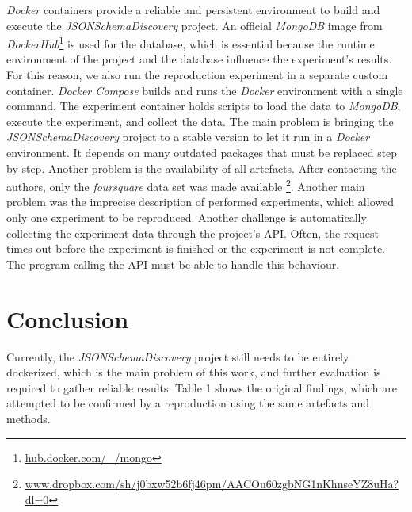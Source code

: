 \documentclass[sigconf, nonacm]{acmart}
\begin{document}
\textit{Docker} containers provide a reliable and persistent environment to build and execute the \textit{JSONSchemaDiscovery} project. An official \textit{MongoDB} image from \textit{DockerHub}\footnote{\url{hub.docker.com/_/mongo}} is used for the database, which is essential because the runtime environment of the project and the database influence the experiment's results. For this reason, we also run the reproduction experiment in a separate custom container. \textit{Docker Compose} builds and runs the \textit{Docker} environment with a single command. The experiment container holds scripts to load the data to \textit{MongoDB}, execute the experiment, and collect the data. The main problem is bringing the \textit{JSONSchemaDiscovery} project to a stable version to let it run in a \textit{Docker} environment. It depends on many outdated packages that must be replaced step by step. Another problem is the availability of all artefacts. After contacting the authors, only the \textit{foursquare} data set \cite{ccelikten2016modeling} was made available \footnote{\url{www.dropbox.com/sh/j0bxw52b6fj46pm/AACOu60zgbNG1nKhnseYZ8uHa?dl=0}}. Another main problem was the imprecise description of performed experiments, which allowed only one experiment to be reproduced. Another challenge is automatically collecting the experiment data through the project's API. Often, the request times out before the experiment is finished or the experiment is not complete. The program calling the API must be able to handle this behaviour.



\section{Conclusion}

Currently, the \textit{JSONSchemaDiscovery} project still needs to be entirely dockerized, which is the main problem of this work, and further evaluation is required to gather reliable results. Table 1 shows the original findings, which are attempted to be confirmed by a reproduction using the same artefacts and methods.




\end{document}
